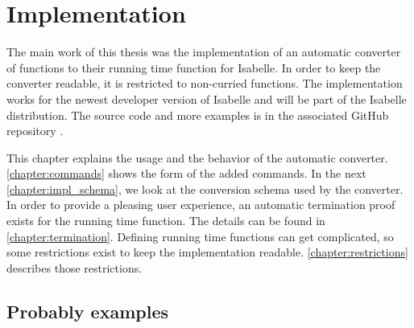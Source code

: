 
\chapter{Implementation}\label{chapter:impl}

The main work of this thesis was the implementation of an automatic converter of functions to their running time function for Isabelle.
In order to keep the converter readable, it is restricted to non-curried functions.
The implementation works for the newest developer version of Isabelle and will be part of the Isabelle distribution.
The source code and more examples is in the associated GitHub repository \cite{repo}.

This chapter explains the usage and the behavior of the automatic converter.
\autoref{chapter:commands} shows the form of the added commands.
In the next \autoref{chapter:impl_schema}, we look at the conversion schema used by the converter.
In order to provide a pleasing user experience, an automatic termination proof exists for the running time function.
The details can be found in \autoref{chapter:termination}.
Defining running time functions can get complicated, so some restrictions exist to keep the implementation readable.
\autoref{chapter:restrictions} describes those restrictions.






\section{Probably examples}
